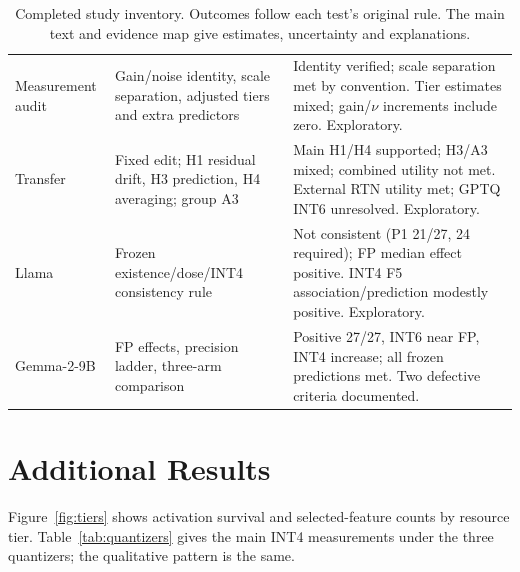 \documentclass[11pt]{article}
\begin{document}
\begin{table}[t]
\begin{tabular}{p{2.2cm}p{6.1cm}p{6.2cm}}
Measurement audit & Gain/noise identity, scale separation, adjusted tiers and extra predictors & Identity verified; scale separation met by convention. Tier estimates mixed; gain/$\nu$ increments include zero. Exploratory.\\
Transfer & Fixed edit; H1 residual drift, H3 prediction, H4 averaging; group A3 & Main H1/H4 supported; H3/A3 mixed; combined utility not met. External RTN utility met; GPTQ INT6 unresolved. Exploratory.\\
Llama & Frozen existence/dose/INT4 consistency rule & Not consistent (P1 21/27, 24 required); FP median effect positive. INT4 F5 association/prediction modestly positive. Exploratory.\\
Gemma-2-9B & FP effects, precision ladder, three-arm comparison & Positive 27/27, INT6 near FP, INT4 increase; all frozen predictions met. Two defective criteria documented.\\
\bottomrule
\end{tabular}
\caption{Completed study inventory. Outcomes follow each test's original rule. The main text and evidence map give estimates, uncertainty and explanations.}
\label{tab:inventory}
\end{table}

\section{Additional Results}
\label{app:robustness}
Figure~\ref{fig:tiers} shows activation survival and selected-feature counts by resource tier. Table~\ref{tab:quantizers} gives the main INT4 measurements under the three quantizers; the qualitative pattern is the same.
\end{document}
